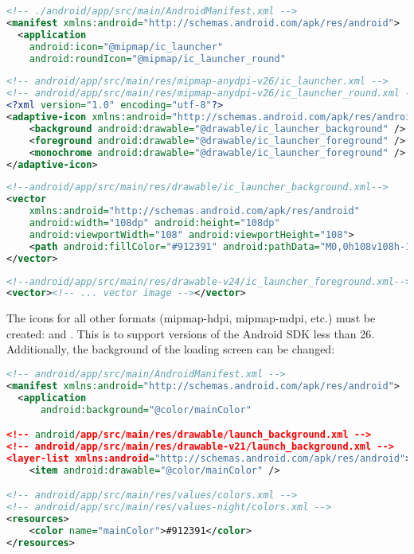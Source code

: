 \begin{lstlisting}[language=xml]
<!-- ./android/app/src/main/AndroidManifest.xml -->
<manifest xmlns:android="http://schemas.android.com/apk/res/android">
  <application
    android:icon="@mipmap/ic_launcher"
    android:roundIcon="@mipmap/ic_launcher_round"
\end{lstlisting}
\begin{lstlisting}[language=xml]
<!-- android/app/src/main/res/mipmap-anydpi-v26/ic_launcher.xml -->
<!-- android/app/src/main/res/mipmap-anydpi-v26/ic_launcher_round.xml -->
<?xml version="1.0" encoding="utf-8"?>
<adaptive-icon xmlns:android="http://schemas.android.com/apk/res/android">
    <background android:drawable="@drawable/ic_launcher_background" />
    <foreground android:drawable="@drawable/ic_launcher_foreground" />
    <monochrome android:drawable="@drawable/ic_launcher_foreground" />
</adaptive-icon>
\end{lstlisting}
\begin{lstlisting}[language=xml]
<!--android/app/src/main/res/drawable/ic_launcher_background.xml-->
<vector
    xmlns:android="http://schemas.android.com/apk/res/android"
    android:width="108dp" android:height="108dp"
    android:viewportWidth="108" android:viewportHeight="108">
    <path android:fillColor="#912391" android:pathData="M0,0h108v108h-108z" />
</vector>
\end{lstlisting}
\begin{lstlisting}[language=xml]
<!--android/app/src/main/res/drawable-v24/ic_launcher_foreground.xml-->
<vector><!-- ... vector image --></vector>
\end{lstlisting}

\noindent The icons for all other formats (mipmap-hdpi, mipmap-mdpi, etc.) must be created:  and . This is to support versions of the Android SDK less than 26. Additionally, the background of the loading screen can be changed:

\begin{lstlisting}[language=xml]
<!-- android/app/src/main/AndroidManifest.xml -->
<manifest xmlns:android="http://schemas.android.com/apk/res/android">
  <application
      android:background="@color/mainColor"

<!-- android/app/src/main/res/drawable/launch_background.xml -->
<!-- android/app/src/main/res/drawable-v21/launch_background.xml -->
<layer-list xmlns:android="http://schemas.android.com/apk/res/android">
    <item android:drawable="@color/mainColor" />

<!-- android/app/src/main/res/values/colors.xml -->
<!-- android/app/src/main/res/values-night/colors.xml -->
<resources>
    <color name="mainColor">#912391</color>
</resources>
\end{lstlisting}

